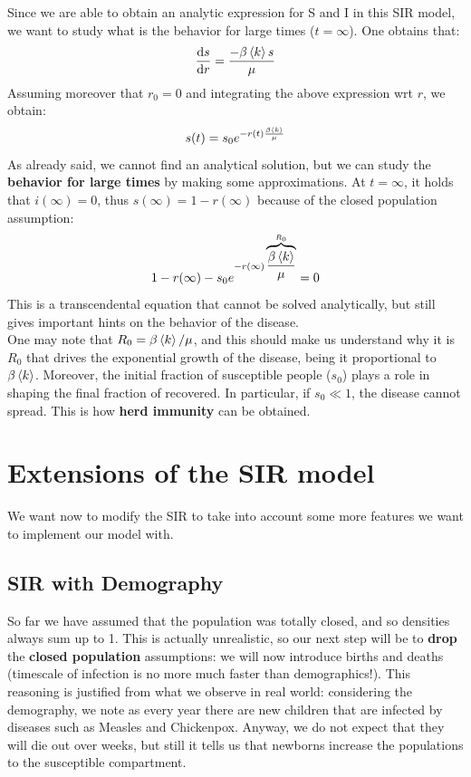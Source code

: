 \documentclass[../main/main.tex]{subfiles}
\begin{document}
Since we are able to obtain an analytic expression for S and I in this SIR model, we want to study what is the behavior for large times ($ t = \infty$). One obtains that:
\begin{equation*}
  \dv{s}{r} = \frac{- \beta  \expval{k}  s}{\mu }
\end{equation*}
Assuming moreover that \( r_0 = 0  \) and integrating the above expression wrt \( r \), we obtain:
\begin{equation*}
  s(t) = s_0 e^{-r(t) \frac{\beta \expval{k} }{\mu }}
\end{equation*}
As already said, we cannot find an analytical solution, but we can study the \textbf{behavior for large times} by making some approximations. At \( t=\infty  \), it holds that \( i (\infty ) = 0 \), thus \( s(\infty ) = 1 - r(\infty ) \) because of the closed population assumption:
\begin{equation*}
  1 - r(\infty ) - s_0 e^{-r(\infty ) \overbrace{\frac{\beta \expval{k} }{\mu }}^{R_0}} = 0
\end{equation*}
This is a transcendental equation that cannot be solved analytically, but still gives important hints on the behavior of the disease.\\
One may note that \( R_0 = \beta \expval{k} / \mu   \), and this should make us understand why it is \( R_0 \) that drives the exponential growth of the disease, being it proportional to $\beta \expval{k}$. Moreover, the initial fraction of susceptible people ($s_0$) plays a role in shaping the final fraction of recovered. In particular, if \( s_0 \ll 1 \), the disease cannot spread. This is how \textbf{herd immunity} can be obtained.


\section{Extensions of the SIR model}
We want now to modify the SIR to take into account some more features we want to implement our model with.

\subsection{SIR with Demography}
So far we have assumed that the population was totally closed, and so densities always sum up to 1. This is actually unrealistic, so our next step will be to \textbf{drop} the \textbf{closed population} assumptions: we will now introduce births and deaths (timescale of infection is no more much faster than demographics!). This reasoning is justified from what we observe in real world: considering the demography, we note as every year there are new children that are infected by diseases such as Measles and Chickenpox. Anyway, we do not expect that they will die out over weeks, but still it tells us that newborns increase the populations to the susceptible compartment.
\end{document}
